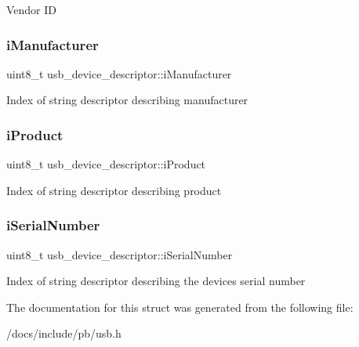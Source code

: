 Vendor ID \mbox{\label{structusb__device__descriptor_ad082330020575944b8471459b816cb40}} 
\subsubsection{\texorpdfstring{i\+Manufacturer}{iManufacturer}}
{\footnotesize\ttfamily uint8\+\_\+t usb\+\_\+device\+\_\+descriptor\+::i\+Manufacturer}

Index of string descriptor describing manufacturer \mbox{\label{structusb__device__descriptor_acb90b91c59e65adbcc21949cf0f486f7}} 
\subsubsection{\texorpdfstring{i\+Product}{iProduct}}
{\footnotesize\ttfamily uint8\+\_\+t usb\+\_\+device\+\_\+descriptor\+::i\+Product}

Index of string descriptor describing product \mbox{\label{structusb__device__descriptor_a105d91b68091e61c9b13ea673fb98eaf}} 
\subsubsection{\texorpdfstring{i\+Serial\+Number}{iSerialNumber}}
{\footnotesize\ttfamily uint8\+\_\+t usb\+\_\+device\+\_\+descriptor\+::i\+Serial\+Number}

Index of string descriptor describing the device\textquotesingle{}s serial number 

The documentation for this struct was generated from the following file\+:\begin{DoxyCompactItemize}
\item 
/docs/include/pb/usb.\+h\end{DoxyCompactItemize}
